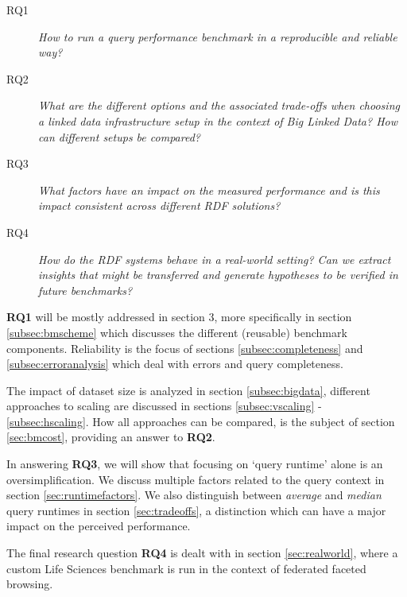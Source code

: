 \begin{description}
\item[RQ1] \emph{How to run a query performance benchmark in a reproducible and reliable way?}
\item[RQ2] \emph{What are the different options and the associated trade-offs when choosing a linked data infrastructure setup in the context of Big Linked Data? How can different setups be compared?}
\item[RQ3] \emph{What factors have an impact on the measured performance and is this impact consistent across different RDF solutions?}
\item[RQ4] \emph{How do the RDF systems behave in a real-world setting? Can we extract insights that might be transferred and generate hypotheses to be verified in future benchmarks?}
\end{description} 

\textbf{RQ1} will be mostly addressed in section 3, more specifically in section \ref{subsec:bmscheme} which discusses the different (reusable) benchmark components. Reliability is the focus of sections \ref{subsec:completeness} and \ref{subsec:erroranalysis} which deal with errors and query completeness. 

The impact of dataset size is analyzed in section \ref{subsec:bigdata}, different approaches to scaling are discussed in sections \ref{subsec:vscaling} - \ref{subsec:hscaling}. How all approaches can be compared, is the subject of section \ref{sec:bmcost}, providing an answer to \textbf{RQ2}. 

In answering \textbf{RQ3}, we will show that focusing on `query runtime' alone is an oversimplification. We discuss multiple factors related to the query context in section \ref{sec:runtimefactors}. We also distinguish between \emph{average} and \emph{median} query runtimes in section \ref{sec:tradeoffs}, a distinction which can have a major impact on the perceived performance.

The final research question \textbf{RQ4} is dealt with in section \ref{sec:realworld}, where a custom Life Sciences benchmark is run in the context of federated faceted browsing. 
